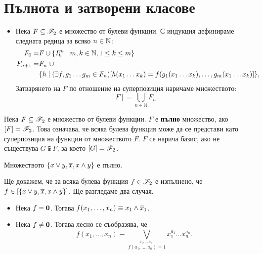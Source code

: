 \section{Пълнота и затворени класове}
\begin{itemize}
\item 
  Нека $F\subseteq \mathscr{F}_2$ е множество от булеви функции.
  С индукция дефинираме следната редица за всяко $n \in \mathbb{N}$:
  \begin{align*}
    F_0 = & F\cup \{I^m_k \mid m,k\in\mathbb{N}, 1\leq k\leq m\}\\
    F_{n+1} = & F_n\ \cup\\
    & \{h \mid (\exists f, g_1\dots g_m \in F_n)[h(x_1\dots x_k) =  f(g_1(x_1\dots x_k), \dots, g_m(x_1\dots x_k)]\},
  \end{align*}
  Затварянето на $F$ по отношение на суперпозиция наричаме множеството:
  \[[F] = \bigcup_{n\in \mathbb{N}}F_n.\]
\end{itemize}



\begin{dfn}
  Нека $F\subseteq \mathscr{F}_2$ е множество от булеви функции. 
  $F$ е {\bf пълно} множество, ако $[F] = \mathscr{F}_2$.
  Това означава, че всяка булева функция може да се представи като суперпозиция на функции от множеството $F$.
  $F$ се нарича базис, ако не съществува $G \subsetneqq F$, за което $[G] = \mathscr{F}_2$.
\end{dfn}

\begin{thm}[Бул]
  Множеството $\{x\vee y,\overline{x},x\wedge y\}$ е пълно.
\end{thm}
\begin{hint}
  Ще докажем, че за всяка булева функция $f \in \mathscr{F}_2$ е изпълнено, че
  $f \in [\{x\vee y, \overline{x}, x \wedge y\}]$.
  Ще разгледаме два случая.
  \begin{itemize}
  \item 
    Нека $f = \bf{0}$. Тогава $f(x_1,\dots,x_n) \equiv x_1\wedge\overline{x}_1$.
  \item
    Нека $f \neq \bf{0}$. Тогава лесно се съобразява, че
    \[f(x_1,\dots,x_n) \equiv \bigvee_{\stackrel{a_1,\dots,a_n:}{f(a_1,\dots,a_n) = 1}} x^{a_1}_1\dots x^{a_n}_n.\]
  \end{itemize}
\end{hint}

